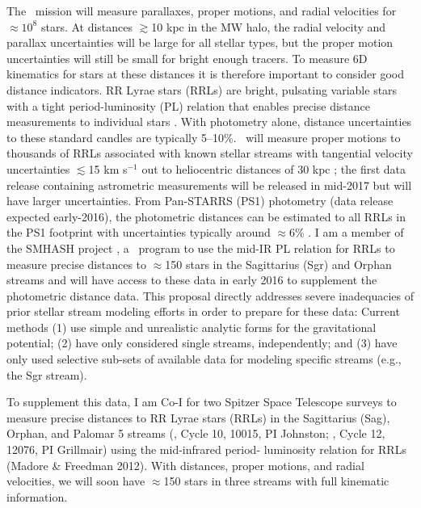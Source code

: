 The \gaia\ mission will measure parallaxes, proper motions, and radial
velocities for $\approx$$10^{8}$ stars. At distances $\gtrsim$10 kpc in the MW
halo, the radial velocity and parallax uncertainties will be large for all
stellar types, but the proper motion uncertainties will still be small for
bright enough tracers. To measure  6D kinematics for stars at these distances it
is therefore important to consider good distance indicators. RR Lyrae stars
(RRLs) are bright, pulsating variable stars with a tight period-luminosity (PL)
relation that enables precise distance measurements to individual stars
\citep{klein14}. With photometry alone, distance uncertainties to these standard
candles are typically 5--10\%. \gaia\ will measure proper motions to thousands
of RRLs associated with known stellar streams with tangential velocity
uncertainties $\lesssim$15 km s$^{-1}$ out to heliocentric distances of 30 kpc
\citep{apw13}; the first data release containing astrometric measurements will
be released in mid-2017 but will have larger uncertainties. From Pan-STARRS
(PS1) photometry (data release expected early-2016), the photometric distances
can be estimated to all RRLs in the PS1 footprint with uncertainties typically
around $\approx$6\% \citep{sesar13b}. I am a member of the SMHASH project
\citep{smashprop}, a \spitzer\ program to use the mid-IR PL relation for RRLs to
measure precise distances to $\approx$150 stars in the Sagittarius (Sgr) and
Orphan streams and will have access to these data in early 2016 to supplement
the photometric distance data. This proposal directly addresses severe
inadequacies of prior stellar stream modeling efforts in order to prepare for
these data: Current methods (1) use simple and unrealistic analytic forms for
the gravitational potential; (2) have only considered single streams,
independently; and (3) have only used selective sub-sets of available data for
modeling specific streams (e.g., the Sgr stream).

To supplement this data, I am Co-I for two Spitzer Space Telescope surveys to
measure precise distances to RR Lyrae stars (RRLs) in the Sagittarius (Sag),
Orphan, and Palomar 5 streams (, Cycle 10, 10015, PI Johnston;
, Cycle 12, 12076, PI Grillmair) using the mid-infrared period-
luminosity relation for RRLs (Madore \& Freedman 2012). With distances, proper
motions, and radial velocities, we will soon have $\approx$150 stars in three
streams with full kinematic information.


